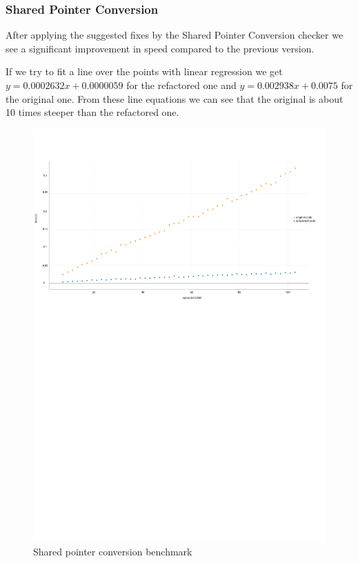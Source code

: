 \subsubsection{Shared Pointer Conversion}
\par After applying the suggested fixes by the Shared Pointer Conversion checker we see a significant improvement in speed compared to the previous version. \medskip
\par If we try to fit a line over the points with linear regression we get $y=0.0002632x+0.0000059$ for the refactored one and $y = 0.002938x+0.0075$ for the original one. From these line equations we can see that the original is about 10 times steeper than the refactored one. 
\begin{figure}[H]
	\caption{Shared pointer conversion benchmark}
	\includegraphics[scale=0.7]{images/shared_ptr_performance.pdf}
\end{figure}

